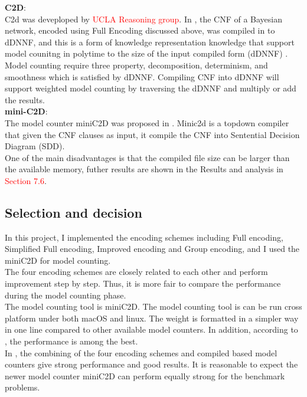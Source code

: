     \textbf{C2D}:\\
    C2d was deveploped by \textcolor{red}{UCLA Reasoning group}. In \cite{c2d}, the CNF of a Bayesian network, encoded using Full Encoding discussed above, was compiled in to d\-DNNF, and this is a form of knowledge representation knowledge that support model counitng in poly\-time to the size of the input compiled form (d\-DNNF) \cite{2002language-map}.\\
    
    Model counting require three property, decomposition, determinism, and smoothness which is satisfied by d\-DNNF. Compiling CNF into d\-DNNF will support weighted model counting by traversing the d\-DNNF and multiply or add the results.\\
    
    \textbf{mini-C2D}:\\
    The model counter mini\-C2D was proposed in \cite{minic2d}. Minic2d is a top\-down compiler that given the CNF clauses as input, it compile the CNF into Sentential Decision Diagram (SDD).\\
    
    One of the main disadvantages is that the compiled file size can be larger than the available memory, futher results are shown in the Results and analysis in \textcolor{red}{Section 7.6}.
    
    \subsection{Selection and decision}
    In this project, I implemented the encoding schemes including Full encoding, Simplified Full encoding, Improved encoding and Group encoding, and I used the miniC2D for model counting. \\
    
    The four encoding schemes are closely related to each other and perform improvement step by step. Thus, it is more fair to compare the performance during the model counting phase.\\
    
    The model counting tool is miniC2D. The model counting tool is can be run cross platform under both macOS and linux. The weight is formatted in a simpler way in one line compared to other available model counters. In addition, according to \cite{minic2d}, the performance is among the best.\\
    
    In \cite{2008-literature-review}, the combining of the four encoding schemes and compiled based model counters give strong performance and good results. It is reasonable to expect the newer model counter miniC2D can perform equally strong for the benchmark problems.
    
